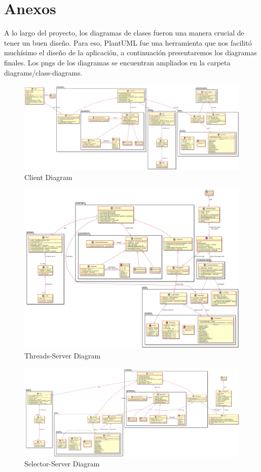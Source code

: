 \section{Anexos}
A lo largo del proyecto, los diagramas de clases fueron una manera crucial de tener un buen diseño. Para eso, PlantUML fue una herramienta que nos facilitó muchísimo el diseño de la aplicación, a continuación presentaremos los diagramas finales. Los pngs de los diagramas se encuentran ampliados en la carpeta diagrams/class-diagrams.
\begin{figure}
    \includegraphics[width=\textwidth,height=\textheight,keepaspectratio]{../diagrams/class-diagrams/clientClasses.png}
    \caption{Client Diagram}
    \label{fig:PropProf}
\end{figure}
\begin{figure}
    \includegraphics[width=\textwidth,height=\textheight,keepaspectratio]{../diagrams/class-diagrams/threadsClasses.png}
    \caption{Threads-Server Diagram}
    \label{fig:PropProf}
\end{figure}
\begin{figure}
    \includegraphics[width=\textwidth,height=\textheight,keepaspectratio]{../diagrams/class-diagrams/selectorClasses.png}
    \caption{Selector-Server Diagram}
    \label{fig:PropProf}
\end{figure}


